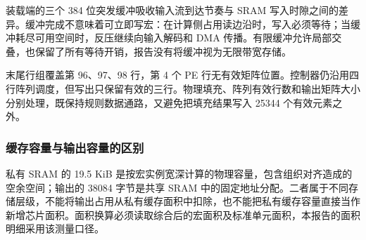 装载端的三个 384 位突发缓冲吸收输入流到达节奏与 SRAM 写入时隙之间的差异。缓冲完成不意味着可立即写宏：在计算侧占用读边沿时，写入必须等待；当缓冲耗尽可用空间时，反压继续向输入解码和 DMA 传播。有限缓冲允许局部交叠，也保留了所有等待开销，报告没有将缓冲视为无限带宽存储。

末尾行组覆盖第 96、97、98 行，第 4 个 PE 行无有效矩阵位置。控制器仍沿用四行阵列调度，但写出只保留有效的三行。物理填充、阵列有效行数和输出矩阵大小分别处理，既保持规则数据通路，又避免把填充结果写入 25344 个有效元素之外。

\subsubsection{缓存容量与输出容量的区别}
私有 SRAM 的 19.5 KiB 是按宏实例宽深计算的物理容量，包含组织对齐造成的空余空间；输出的 38084 字节是共享 SRAM 中的固定地址分配。二者属于不同存储层级，不能将输出占用从私有缓存面积中扣除，也不能把私有缓存容量直接当作新增芯片面积。面积换算必须读取综合后的宏面积及标准单元面积，本报告的面积明细采用该测量口径。
